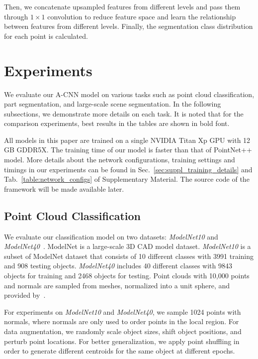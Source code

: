 \documentclass[10pt,twocolumn,letterpaper]{article}
\begin{document}
Then, we concatenate upsampled features from different levels and pass them through $1\times1$ convolution to reduce feature space and learn the relationship between features from different levels. Finally, the segmentation class distribution for each point is calculated.
\vspace{-1mm}
\section{Experiments}\vspace{-1mm}
\label{sec:experiments}
We evaluate our A-CNN model on various tasks such as point cloud classification, part segmentation, and large-scale scene segmentation. In the following subsections, we demonstrate more details on each task. It is noted that for the comparison experiments, best results in the tables are shown in bold font.

All models in this paper are trained on a single NVIDIA Titan Xp GPU with 12 GB GDDR5X. The training time of our model is faster than that of PointNet++ model. More details about the network configurations, training settings and timings in our experiments can be found in Sec.~\ref{sec:suppl_training_details} and Tab.~\ref{table:network_configs} of Supplementary Material. The source code of the framework will be made available later.
\vspace{-1mm}
\subsection{Point Cloud Classification}\vspace{-1mm}
We evaluate our classification model on two datasets: \textit{ModelNet10} and \textit{ModelNet40}~\cite{wu20153d}. ModelNet is a large-scale 3D CAD model dataset. \textit{ModelNet10} is a subset of ModelNet dataset that consists of 10 different classes with 3991 training and 908 testing objects. \textit{ModelNet40} includes 40 different classes with 9843 objects for training and 2468 objects for testing. Point clouds with 10,000 points and normals are sampled from meshes, normalized into a unit sphere, and provided by~\cite{qi2017pointnet++}.

For experiments on \textit{ModelNet10} and \textit{ModelNet40}, we sample 1024 points with normals, where normals are only used to order points in the local region. For data augmentation, we randomly scale object sizes, shift object positions, and perturb point locations. For better generalization, we apply point shuffling in order to generate different centroids for the same object at different epochs.
\end{document}
